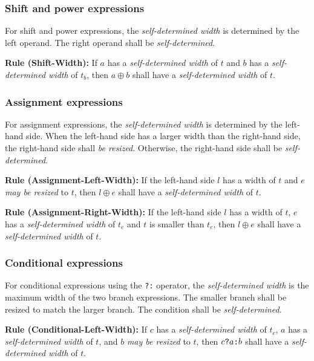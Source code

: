 \documentclass{article}
\newcommand{\sds}{\emph{self-determined width}}
\newcommand{\mbr}{\emph{may be resized}}
\newenvironment{typingrule}[1]%
{\par\noindent\textbf{Rule (#1):} }%
{\par}
\begin{document}
\subsubsection{Shift and power expressions}%

For shift and power expressions, the \sds{} is determined
by the left operand. The right operand shall be \emph{self-determined}.

\begin{typingrule}{Shift-Width}
  If $a$ has a \sds{} of $t$ and $b$ has a
  \sds{} of $t_{b}$, then $a \oplus b$ shall have a
  \sds{} of $t$.
\end{typingrule}

\subsubsection{Assignment expressions}%

For assignment expressions, the \sds{} is determined by the
left-hand side. When the left-hand side has a larger width than the right-hand
side, the right-hand side shall \emph{be resized}. Otherwise, the right-hand
side shall be \emph{self-determined}.

\begin{typingrule}{Assignment-Left-Width}
  If the left-hand side $l$ has a width of $t$ and $e$ \mbr{} to
  $t$, then $l \oplus e$ shall have a \sds{} of $t$.
\end{typingrule}

\begin{typingrule}{Assignment-Right-Width}
  If the left-hand side $l$ has a width of $t$, $e$ has a
  \sds{} of $t_{e}$ and $t$ is smaller than $t_{e}$, then
  $l \oplus e$ shall have a \sds{} of $t$.
\end{typingrule}

\subsubsection{Conditional expressions}%

For conditional expressions using the \texttt{?:} operator, the
\sds{} is the maximum width of the two branch expressions.
The smaller branch shall be resized to match the larger branch. The condition
shall be \emph{self-determined}.

\begin{typingrule}{Conditional-Left-Width}
  If $c$ has a \sds{} of $t_{c}$, $a$ has a
  \sds{} of $t$, and $b$ \mbr{} to $t$,
  then $c \verb|?| a \verb|:| b$ shall have a \sds{} of
  $t$.
\end{typingrule}
\end{document}
